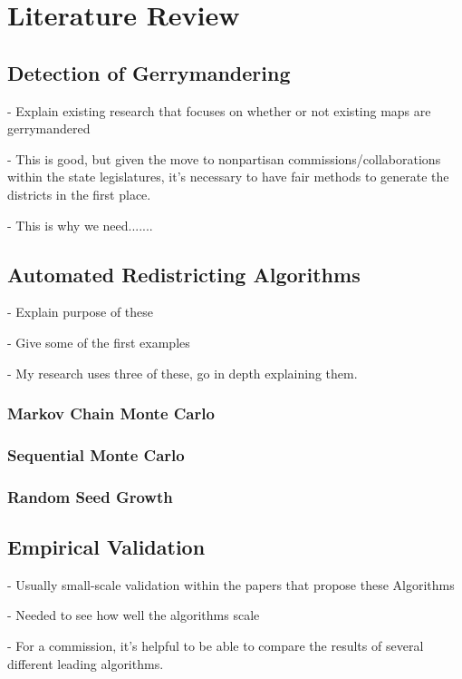 \section{Literature Review}

\subsection{Detection of Gerrymandering}

- Explain existing research that focuses on whether or not existing maps are gerrymandered

- This is good, but given the move to nonpartisan commissions/collaborations within the state legislatures, it's necessary to have fair methods to generate the districts in the first place. 

- This is why we need.......

\subsection{Automated Redistricting Algorithms}

- Explain purpose of these

- Give some of the first examples

- My research uses three of these, go in depth explaining them. 

\subsubsection{Markov Chain Monte Carlo}

\subsubsection{Sequential Monte Carlo}

\subsubsection{Random Seed Growth}

\subsection{Empirical Validation}

- Usually small-scale validation within the papers that propose these Algorithms

- Needed to see how well the algorithms scale

- For a commission, it's helpful to be able to compare the results of several different leading algorithms. 

